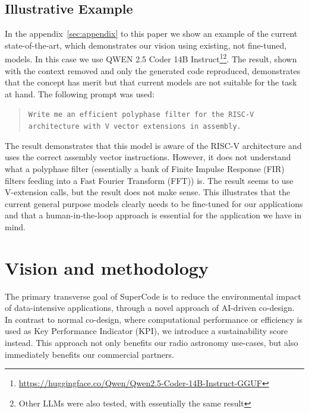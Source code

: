 \documentclass[a4wide,twocolumn]{article}
\begin{document}
\subsection{Illustrative Example}
In the appendix~\ref{sec:appendix} to this paper we show an example of the current state-of-the-art, which demonstrates our vision using existing, not fine-tuned, models. In this case we use QWEN 2.5 Coder 14B Instruct\footnote{\url{https://huggingface.co/Qwen/Qwen2.5-Coder-14B-Instruct-GGUF}}\footnote{Other LLMs were also tested, with essentially the same result}. The result, shown with the context removed and only the generated code reproduced, demonstrates that the concept has merit but that current models are not suitable for the task at hand. The following prompt was used:
\begin{quote}
\texttt{Write me an efficient polyphase filter for the RISC-V architecture with V vector extensions in assembly.}
\end{quote}
The result demonstrates that this model is aware of the RISC-V architecture and uses the correct assembly vector instructions. However, it does not understand what a polyphase filter (essentially a bank of Finite Impulse Response (FIR) filters feeding into a Fast Fourier Transform (FFT)) is. The result seems to use V-extension calls, but the result does not make sense. This illustrates that the current general purpose models clearly needs to be fine-tuned for our applications and that a human-in-the-loop approach is essential for the application we have in mind.


\section{Vision and methodology}

The primary transverse goal of SuperCode is to reduce the environmental impact of data-intensive applications, through a novel approach of AI-driven co-design. 
In contrast to normal co-design, where computational performance or efficiency is used as Key Performance Indicator (KPI), we introduce a sustainability score instead. 
This approach not only benefits our radio astronomy use-cases, but also immediately benefits our commercial partners.
\end{document}
